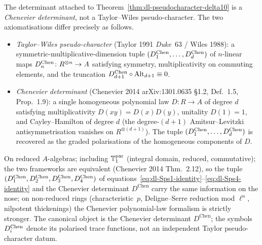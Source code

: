 \begin{remark}
\label{rem:dl-chenevier-determinant-not-pseudocharacter}
The determinant attached to
Theorem~\ref{thm:dl-pseudocharacter-delta10} is a
\emph{Chenevier determinant}, not a Taylor--Wiles pseudo-character.
The two axiomatisations differ precisely as follows.
\begin{itemize}
 \item \emph{Taylor--Wiles pseudo-character} (Taylor 1991 \emph{Duke}\
 63 / Wiles 1988): a symmetric-multiplicative-dimension tuple
 $(D^{\mathrm{Chen}}_1,\dots,D^{\mathrm{Chen}}_d)$ of $n$-linear maps $D^{\mathrm{Chen}}_n\colon
 R^{\otimes n}\to A$ satisfying symmetry, multiplicativity on
 commuting elements, and the truncation
 $D^{\mathrm{Chen}}_{d+1}\circ\mathrm{Alt}_{d+1}\equiv 0$.
 \item \emph{Chenevier determinant} (Chenevier 2014 arXiv:1301.0635
 \S1.2, Def.~1.5, Prop.~1.9): a single homogeneous polynomial law
 $D\colon R\to A$ of degree $d$ satisfying multiplicativity
 $D(xy)=D(x)D(y)$, unitality $D(1)=1$, and Cayley--Hamilton of
 degree $d$ (the degree-$(d+1)$ Amitsur--Levitzki antisymmetrisation
 vanishes on $R^{\otimes(d+1)}$). The tuple $(D^{\mathrm{Chen}}_1,\dots,D^{\mathrm{Chen}}_d)$
 is recovered as the graded polarisations of the homogeneous
 components of $D$.
\end{itemize}
On reduced $A$-algebras; including $\mathbb{T}^{\mathrm{par}}_1$ (integral domain,
reduced, commutative); the two frameworks are equivalent
(Chenevier 2014 Thm.~2.12), so the tuple
$(D^{\mathrm{Chen}}_1,D^{\mathrm{Chen}}_2,D^{\mathrm{Chen}}_3,D^{\mathrm{Chen}}_4)$ of
equations~\eqref{eq:dl-Sps1-identity}--\eqref{eq:dl-Sps4-identity}
and the Chenevier determinant $D^{\mathrm{Chen}}$ carry the same
information on the nose; on non-reduced rings (characteristic~$p$,
Deligne--Serre reduction mod $\ell^n$, nilpotent thickenings) the
Chenevier polynomial-law formalism is strictly stronger. The canonical
object is the Chenevier determinant $D^{\mathrm{Chen}}$; the symbols
$D^{\mathrm{Chen}}_i$ denote its polarised trace functions, not an independent
Taylor pseudo-character datum.
\end{remark}

